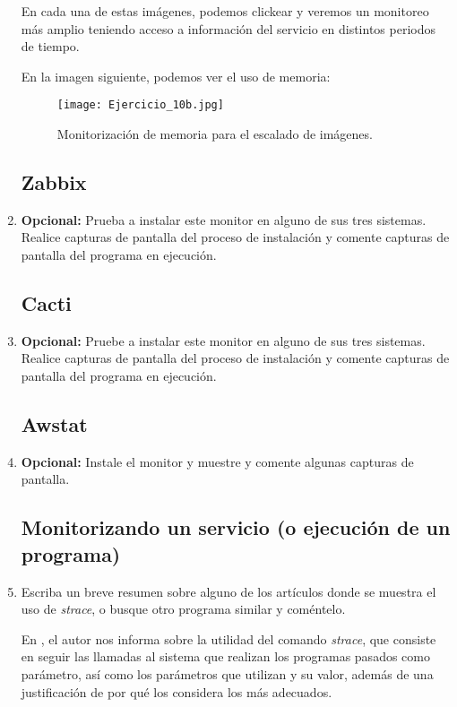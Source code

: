 \documentclass[paper=a4, fontsize=11pt]{scrartcl} %
\numberwithin{equation}{section} %
\numberwithin{figure}{section} %
\numberwithin{table}{section} %
\begin{document}
\begin{enumerate}
		En cada una de estas imágenes, podemos clickear y veremos un monitoreo más amplio teniendo
		acceso a información del servicio en distintos periodos de tiempo.
		
		En la imagen siguiente, podemos ver el uso de memoria\cite{ganglia_WM_2}:
		
		\begin{figure}[H]
			\centering
			\texttt{[image: Ejercicio\_10b.jpg]}
			\caption{Monitorización de memoria para el escalado de imágenes.}
			\label{fig:Ganglia_memoria}
		\end{figure}
		
		
	\subsection{Zabbix}
		\item \textbf{Opcional:} Prueba a instalar este monitor en alguno de sus tres sistemas.
		Realice capturas de pantalla del proceso de instalación y comente capturas de pantalla
		del programa en ejecución.
		
	\subsection{Cacti}
		\item \textbf{Opcional:} Pruebe a instalar este monitor en alguno de sus tres sistemas.
		Realice capturas de pantalla del proceso de instalación y comente capturas de pantalla
		del programa en ejecución.
		
	\subsection{Awstat}
		\item \textbf{Opcional:} Instale el monitor y muestre y comente algunas capturas de pantalla.
		
	\subsection{Monitorizando un servicio (o ejecución de un programa)}
		\item Escriba un breve resumen sobre alguno de los artículos donde se muestra el uso de
		\textit{strace}, o busque otro programa similar y coméntelo.
		
		En \cite{strace1}, el autor nos informa sobre la utilidad del comando \textit{strace}, que
		consiste en seguir las llamadas al sistema que realizan los programas pasados como parámetro,
		así como los parámetros que utilizan y su valor, además de una justificación de por qué los
		considera los más adecuados.
		

\end{enumerate}
\end{document}
